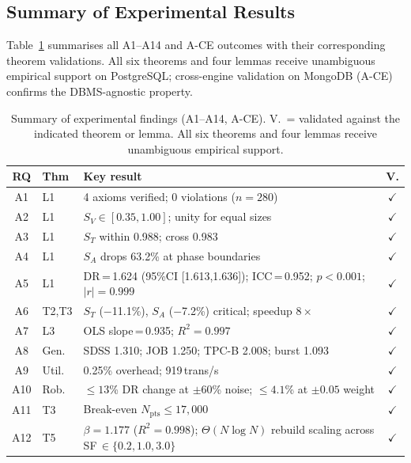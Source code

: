 \documentclass[10pt,twocolumn,a4paper]{article}
\newcommand{\SV}{S_{V}}
\newcommand{\ST}{S_{T}}
\newcommand{\SA}{S_{A}}
\newcommand{\Npts}{N_{\mathrm{pts}}}
\begin{document}
\FloatBarrier
\subsection{Summary of Experimental Results}

Table~\ref{tab:summary} summarises all A1--A14 and A-CE outcomes with
their corresponding theorem validations. All six theorems and four
lemmas receive unambiguous empirical support on PostgreSQL; cross-engine
validation on MongoDB (A-CE) confirms the DBMS-agnostic property.

\begin{table}[!htb]\centering\scriptsize
\caption{Summary of experimental findings (A1--A14, A-CE). V.\ = validated against the indicated theorem or lemma. All six theorems and four lemmas receive unambiguous empirical support.}\label{tab:summary}
\setlength{\tabcolsep}{3pt}
\begin{tabular}{@{}clp{4.8cm}c@{}}
\toprule
\textbf{RQ} & \textbf{Thm} & \textbf{Key result} & \textbf{V.}\\
\midrule
A1  & L1   & 4 axioms verified; 0 violations ($n\!=\!280$)       & $\checkmark$\\
A2  & L1   & $\SV\!\in\![0.35,1.00]$; unity for equal sizes      & $\checkmark$\\
A3  & L1   & $\ST$ within 0.988; cross 0.983                     & $\checkmark$\\
A4  & L1   & $\SA$ drops 63.2\% at phase boundaries              & $\checkmark$\\
A5  & L1   & DR\,=\,1.624 (95\%CI [1.613,1.636]); ICC\,=\,0.952; $p\!<\!0.001$; $|r|\!=\!0.999$ & $\checkmark$\\
A6  & T2,T3 & $\ST$ ($-$11.1\%), $\SA$ ($-$7.2\%) critical; speedup $8\times$  & $\checkmark$\\
A7  & L3   & OLS slope\,=\,0.935; $R^2\!=\!0.997$               & $\checkmark$\\
A8  & Gen. & SDSS 1.310; JOB 1.250; TPC-B 2.008; burst 1.093    & $\checkmark$\\
A9  & Util.& 0.25\% overhead; 919\,trans/s                       & $\checkmark$\\
A10 & Rob. & $\leq\!13$\% DR change at $\pm60$\% noise; $\leq\!4.1$\% at $\pm0.05$ weight & $\checkmark$\\
A11 & T3   & Break-even $\Npts\!\leq\!17{,}000$                  & $\checkmark$\\
A12 & T5   & $\beta\!=\!1.177$ ($R^2\!=\!0.998$); $\Theta(N\log N)$ rebuild scaling across SF\,$\in\{0.2,1.0,3.0\}$ & $\checkmark$\\

\end{tabular}
\end{table}
\end{document}
